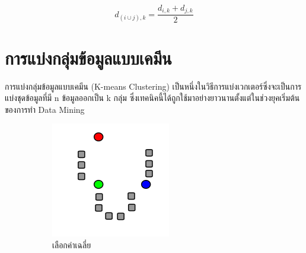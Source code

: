 \begin{equation}\label{eq:wpgma}
    d_{(i \cup j),k} = \frac{d_{i,k} + d_{j,k}}{2} 
\end{equation}

\section{การแบ่งกลุ่มข้อมูลแบบเคมีน}
\label{sec:k_means}

การแบ่งกลุ่มข้อมูลแบบเคมีน (K-means Clustering) เป็นหนึ่งในวิธีการแบ่งเวกเตอร์ซึ่งจะเป็นการแบ่งชุดข้อมูลที่มี n ข้อมูลออกเป็น k กลุ่ม
ซึ่งเทคนิคนี้ได้ถูกใช้มาอย่างยาวนานตั้งแต่ในช่วงยุคเริ่มต้นของการทำ Data Mining\autocite{macqueen1967}

\begin{figure}[H]
    \centering
    \begin{subfigure}{0.5\textwidth}
        \centering
        \includegraphics[width=0.9\linewidth]{fig/k-means-step1.png}
        \caption{เลือกค่าเฉลี่ย}
        \label{fig:k_means_step1}
    \end{subfigure}%
    \begin{subfigure}{0.5\textwidth}
        \centering

\end{subfigure}
\end{figure}
